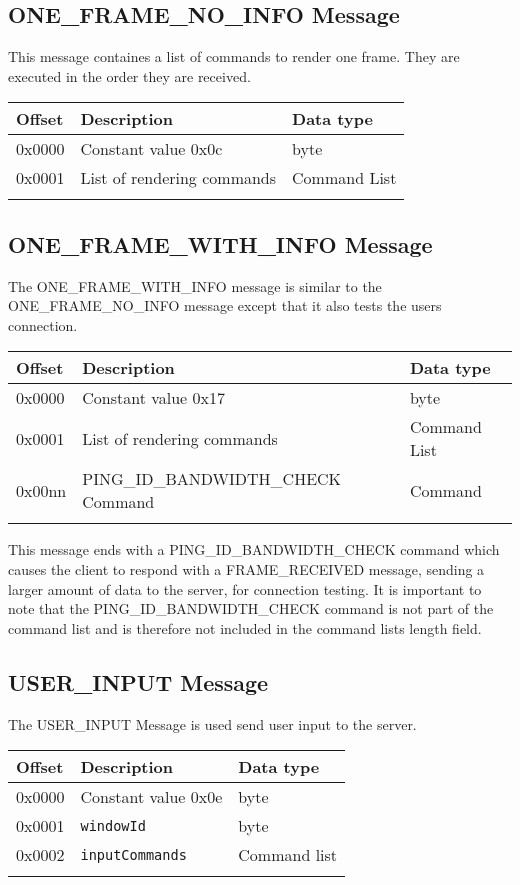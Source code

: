 \documentclass{article}
\newcommand{\field}[1]{\textcolor{fieldColor}{\texttt{#1}}}
\newenvironment{bytelisting}
{\ttfamily \begin{center} \begin{tabular}{l l l} Offset & Description & Data type \\ \hline}
{\normalfont \end{tabular} \end{center}}
\begin{document}
\subsection{ONE\_FRAME\_NO\_INFO Message}
This message containes a list of commands to render one frame. They are executed in the order they are received.

\begin{bytelisting}
0x0000 & Constant value 0x0c & byte \\
0x0001 & List of rendering commands & Command List \\
\end{bytelisting}

\subsection{ONE\_FRAME\_WITH\_INFO Message}
The ONE\_FRAME\_WITH\_INFO message is similar to the \\
ONE\_FRAME\_NO\_INFO message except that it also tests the users connection.

\begin{bytelisting}
0x0000 & Constant value 0x17 & byte \\
0x0001 & List of rendering commands & Command List \\
0x00nn & PING\_ID\_BANDWIDTH\_CHECK Command & Command \\
\end{bytelisting}

This message ends with a PING\_ID\_BANDWIDTH\_CHECK command which causes the client to respond with a FRAME\_RECEIVED message, sending a larger amount of data to the server, for connection testing.
It is important to note that the PING\_ID\_BANDWIDTH\_CHECK command is not part of the command list and is therefore not included in the command lists length field.

\subsection{USER\_INPUT Message}
The USER\_INPUT Message is used send user input to the server.

\begin{bytelisting}
0x0000 & Constant value 0x0e & byte \\
0x0001 & \field{windowId} & byte \\
0x0002 & \field{inputCommands} & Command list \\
\end{bytelisting}
\end{document}
